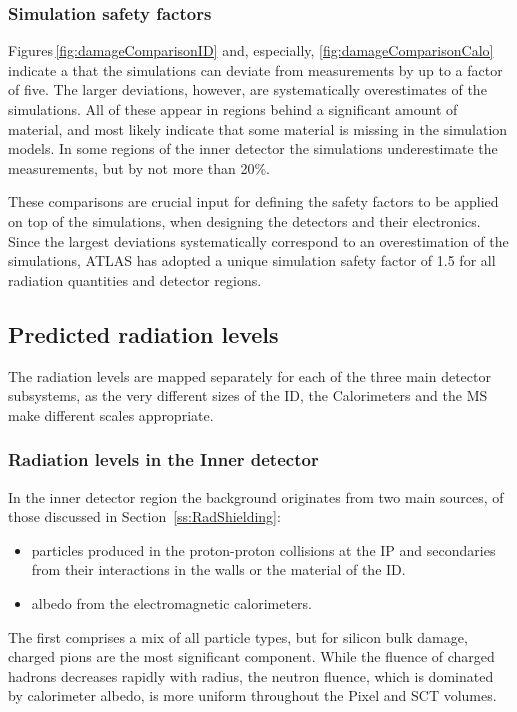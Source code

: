 \documentclass[cernpreprint, atlasdraft=false, UKenglish,british,orcidlogo, texmf, orcidlogo]{atlasdoc}
\begin{document}
\subsubsection{Simulation safety factors}
 
Figures\,\ref{fig:damageComparisonID} and, especially, \ref{fig:damageComparisonCalo} indicate a that the simulations can deviate from
measurements by up to a factor of five. The larger deviations, however, are systematically overestimates of the simulations. All of these
appear in regions behind a significant amount of material, and most likely indicate that some material is missing in the simulation models.
In some regions of the inner detector the simulations underestimate the measurements, but by not more than 20\%.
 
These comparisons are crucial input for defining the safety factors to be applied on top of the simulations, when designing the detectors and
their electronics. Since the largest deviations systematically correspond to an overestimation of the simulations, ATLAS has adopted a
unique simulation safety factor of 1.5 for all radiation quantities and detector regions.
 
 
 
\subsection{Predicted \RunThr radiation levels}
The radiation levels are mapped separately for each of the three main detector subsystems, as the very different sizes of the \gls{ID}, the Calorimeters and
the \gls{MS} make different scales appropriate.
 
\subsubsection{Radiation levels in the Inner detector}
 
In the inner detector region the background originates from two main sources, of those discussed in Section~\ref{ss:RadShielding}:
\begin{itemize}
\item particles produced in the proton-proton collisions at the \gls{IP} and secondaries from their
interactions in the \beampipe walls or the material of the \gls{ID}.
\item albedo from the electromagnetic calorimeters.
\end{itemize}
The first comprises a mix of all particle types, but for silicon bulk damage, charged pions are
the most significant component.
While the fluence of charged hadrons decreases rapidly with radius, the neutron fluence, which is
dominated by calorimeter albedo, is more uniform throughout the Pixel and \gls{SCT} volumes.
 
\end{document}
